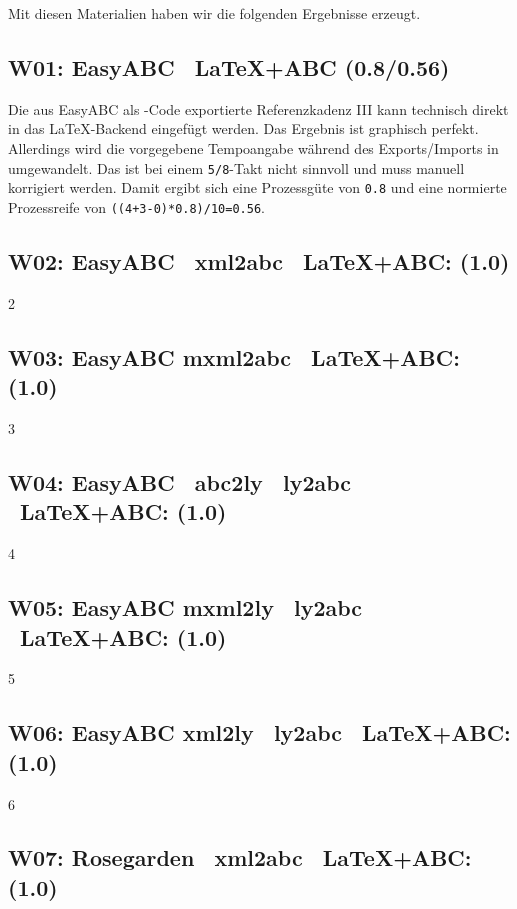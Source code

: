 Mit diesen Materialien haben wir die folgenden Ergebnisse erzeugt.

\subsection{W01: Easy\-ABC \ra\ \LaTeX+ABC (0.8/0.56)}

Die aus Easy\-ABC als -Code exportierte Referenzkadenz III kann
technisch direkt in das \LaTeX-Backend eingefügt werden. Das Ergebnis ist
graphisch perfekt. Allerdings wird die vorgegebene Tempoangabe \texttt{}
während des Exports/Imports in \texttt{} umgewandelt. Das ist bei einem
\texttt{5/8}-Takt nicht sinnvoll und muss manuell korrigiert werden. Damit
ergibt sich eine Prozessgüte von \texttt{0.8} und eine normierte Prozessreife von
\texttt{((4+3-0)*0.8)/10=0.56}.

\subsection{W02: Easy\-ABC \ra\ xml2abc \ra\ \LaTeX+ABC: (1.0)}

2

\subsection{W03: Easy\-ABC \ra mxml2abc \ra\ \LaTeX+ABC: (1.0)}

3

\subsection{W04: Easy\-ABC \ra\ abc2ly \ra\ ly2abc \ra\ \LaTeX+ABC: (1.0)}

4

\subsection{W05: Easy\-ABC \ra mxml2ly \ra\ ly2abc \ra\ \LaTeX+ABC: (1.0)}

5

\subsection{W06: Easy\-ABC \ra xml2ly \ra\ ly2abc \ra\ \LaTeX+ABC: (1.0)}

6

\subsection{W07: Rose\-garden \ra\ xml2abc \ra\ \LaTeX+ABC: (1.0)} 

